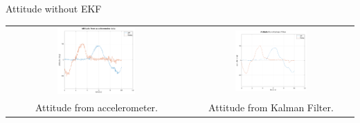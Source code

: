 \begin{frame}{Attitude without EKF}

\begin{center}
\begin{tabular}{cc}
\includegraphics[width=0.45\textwidth]{figures/acc_attitude.png} & 
\includegraphics[width=0.45\textwidth]{figures/attitude_kalman.png} \\
Attitude from accelerometer. & Attitude from Kalman Filter.
\end{tabular}
\end{center}

\end{frame}